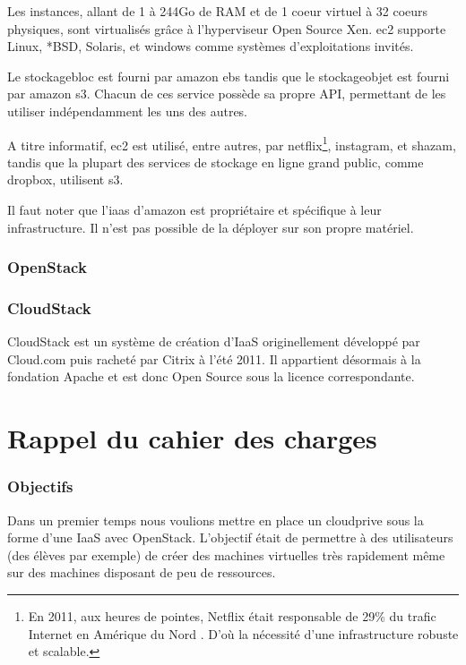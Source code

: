 \documentclass[a4paper,oneside]{report}
\begin{document}
Les instances, allant de 1 à 244Go de RAM et de 1 coeur virtuel à 32 coeurs physiques, sont virtualisés grâce à l'hyperviseur Open Source Xen.
\gls{ec2} supporte Linux, *BSD, Solaris, et \gls{windows} comme systèmes d'exploitations invités.

Le \gls{stockagebloc} est fourni par \gls{amazon} \gls{ebs} tandis que le \gls{stockageobjet} est fourni par \gls{amazon} \gls{s3}.
Chacun de ces service possède sa propre API, permettant de les utiliser indépendamment les uns des autres.

A titre informatif, \gls{ec2} est utilisé, entre autres, par \gls{netflix}\footnote{En 2011, aux heures de pointes, Netflix était responsable de 29\% du trafic Internet en Amérique du Nord \cite{NetflixTrafic}. D'où la nécessité d'une infrastructure robuste et scalable.}, \gls{instagram}, et \gls{shazam}, tandis que la plupart des services de stockage en ligne grand public, comme \gls{dropbox}, utilisent \gls{s3}.

Il faut noter que l'\gls{iaas} d'\gls{amazon} est propriétaire et spécifique à leur infrastructure. Il n'est pas possible de la déployer sur son propre matériel.

\subsubsection{OpenStack}

\subsubsection{CloudStack}
CloudStack est un système de création d'IaaS originellement développé par Cloud.com puis racheté par Citrix à l'été 2011.
Il appartient désormais à la fondation Apache et est donc Open Source sous la licence correspondante.\newline


\section{Rappel du cahier des charges}
\subsubsection{Objectifs}
Dans un premier temps nous voulions mettre en place un \gls{cloudprive} sous la forme d'une IaaS avec OpenStack.
L'objectif était de permettre à des utilisateurs (des élèves par exemple) de créer des machines virtuelles très rapidement même sur des machines disposant de peu de ressources.\\
\end{document}

